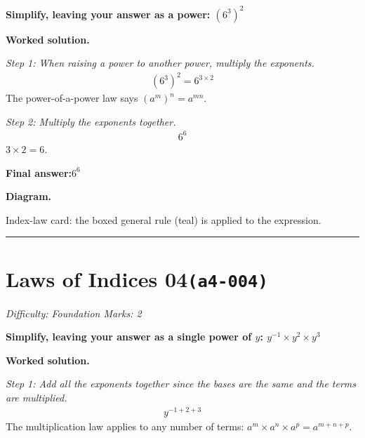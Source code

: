 \documentclass[11pt]{article}
\newcommand{\question}[1]{\par\medskip\noindent\textbf{#1}\par}
\begin{document}
\question{Simplify, leaving your answer as a power: \( (6^3)^2 \)}

\textbf{Worked solution.}

\textit{Step 1: When raising a power to another power, multiply the exponents.}
\[\begin{gathered}
(6^3)^2 = 6^{3 \times 2}
\end{gathered}\]
The power-of-a-power law says \( (a^m)^n = a^{mn} \).

\textit{Step 2: Multiply the exponents together.}
\[\begin{gathered}
6^{6}
\end{gathered}\]
\( 3 \times 2 = 6 \).

\begin{answerbox}
\textbf{Final answer:}\quad \(\displaystyle 6^{6}\)
\end{answerbox}
\textbf{Diagram.}

\begin{center}
\end{center}
\small Index-law card: the boxed general rule (teal) is applied to the expression.\normalsize

\medskip\hrule

\section*{Laws of Indices 04\quad\small\texttt{(a4-004)}}
\textit{Difficulty: Foundation \quad\textbar\quad Marks: 2}

\question{Simplify, leaving your answer as a single power of \( y \): \( y^{-1} \times y^2 \times y^3 \)}

\textbf{Worked solution.}

\textit{Step 1: Add all the exponents together since the bases are the same and the terms are multiplied.}
\[\begin{gathered}
y^{-1+2+3}
\end{gathered}\]
The multiplication law applies to any number of terms: \( a^m \times a^n \times a^p = a^{m+n+p} \).
\end{document}
